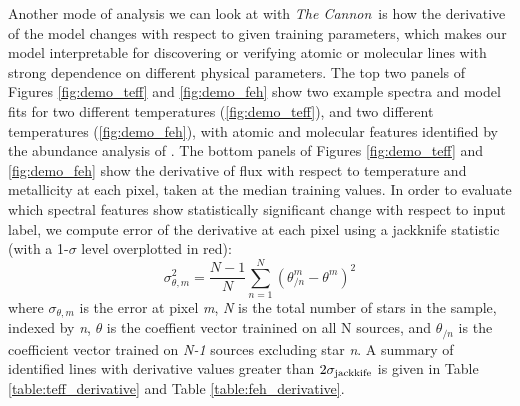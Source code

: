 \documentclass[twocolumn]{aastex62}
\newcommand{\thecannon}{\textsl{The Cannon}}
\begin{document}
Another mode of analysis we can look at with \thecannon\ is how the derivative of the model changes with respect to given training parameters, which makes our model interpretable for discovering or verifying atomic or molecular lines with strong dependence on different physical parameters. The top two panels of Figures \ref{fig:demo_teff} and \ref{fig:demo_feh} show two example spectra and model fits for two different temperatures (\ref{fig:demo_teff}), and two different temperatures (\ref{fig:demo_feh}), with atomic and molecular features identified by the abundance analysis of \citealt{Souto:2017}. The bottom panels of Figures \ref{fig:demo_teff} and \ref{fig:demo_feh} show the derivative of flux with respect to temperature and metallicity at each pixel, taken at the median training values. In order to evaluate which spectral features show statistically significant change with respect to input label, we compute error of the derivative at each pixel using a jackknife statistic (with a 1-$\sigma$ level overplotted in red):
\begin{equation}
	\sigma_{\theta,m}^2 = \frac{N-1}{N} \sum^N_{n=1} (\theta_{/n}^m - \theta^m)^2 
\end{equation}
where $\sigma_{\theta,m}$ is the error at pixel \emph{m}, \emph{N} is the total number of stars in the sample, indexed by \emph{n}, $\theta$ is the coeffient vector trainined on all N sources, and $\theta_{/n}$ is the coefficient vector trained on \emph{N-1} sources excluding star \emph{n}. A summary of identified lines with derivative values greater than $2\sigma_{\rm jackkife}$ is given in Table \ref{table:teff_derivative} and Table \ref{table:feh_derivative}.
\end{document}

